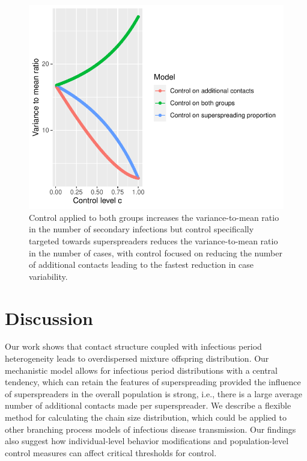 \documentclass{imammb}
\numberwithin{equation}{section}
\begin{document}
\begin{figure}
    \centering
    \includegraphics{Figure9.pdf}
    \caption{Control applied to both groups increases the variance-to-mean ratio in the number of secondary infections but control specifically targeted towards superspreaders reduces the variance-to-mean ratio in the number of cases, with control focused on reducing the number of additional contacts leading to the fastest reduction in case variability. }
    \label{fig:varmeanratio}
\end{figure}




\section{Discussion}

Our work shows that contact structure coupled with infectious period heterogeneity leads to overdispersed mixture offspring distribution. Our mechanistic model allows for infectious period distributions with a central tendency, which can retain the features of superspreading provided the influence of superspreaders in the overall population is strong, i.e., there is a large average number of additional contacts made per superspreader. We describe a flexible method for calculating the chain size distribution, which could be applied to other branching process models of infectious disease transmission. Our findings also suggest how individual-level behavior modifications and population-level control measures can affect critical thresholds for control.
\end{document}

